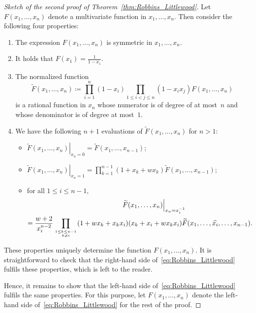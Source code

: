 \documentclass[ALCO, Unicode]{cedram}
\newcommand\myatop[2]{\genfrac{}{}{0pt}{}{#1}{#2}}
\begin{document}
	\begin{proof}[Sketch of the second proof of Theorem~\ref{thm:Robbins_Littlewood}]
		Let $F(x_1,\dots,x_n)$ denote a multivariate function in $x_1,\dots,x_n$. Then consider the following four properties:
		\begin{enumerate}[label=(\roman*)]
			\item\label{enum:IK1} The expression $F(x_1,\dots,x_n)$ is symmetric in $x_1,\dots,x_n$.
			\item\label{enum:IK2}  It holds that $F(x_1)=\frac{1}{1-x_1}$.
			\item\label{enum:IK3} The normalized function
			\begin{equation*}
				\widetilde{F}(x_1,\dots,x_n) \coloneqq \prod_{i=1}^{n} (1-x_i) \prod_{1 \le i < j \le n} (1-x_i x_j)F(x_1,\dots,x_n)
			\end{equation*} is a rational function in $x_n$ whose numerator is of degree 	of at most~$n$ and whose denominator is of degree at most~$1$.
			\item\label{enum:IK4} We have the following $n+1$ evaluations of $\widetilde{F}(x_1,\dots,x_n)$ for $n > 1$:
			\begin{itemize}
				\item $\left.\widetilde{F}(x_1,\dots,x_n)\right\vert_{x_n=0} = \widetilde{F}(x_1,\dots,x_{n-1})$;
				\item $\left.\widetilde{F}(x_1,\dots,x_n)\right\vert_{x_n=1} = \prod_{k=1}^{n-1} (1 + x_k + w x_k) \widetilde{F}(x_1,\dots,x_{n-1})$;
				\item for all $1 \le i \le n-1$, 
				\begin{multline*}
					\qquad\qquad\left.\widetilde{F}(x_1,\dots,x_n)\right\vert_{x_n=x_i^{-1}} \\
					= \frac{w+2}{x_i^{n-2}} \prod_{\myatop{1 \le k \le n-1}{k \neq i}} (1 + w x_k + x_k x_i)(x_k + x_i + w x_k x_i) \widetilde{F}(x_1,\dots,\widehat{x_i},\dots,x_{n-1}).
				\end{multline*}
			\end{itemize}	
		\end{enumerate}
		
		These properties uniquely determine the function $F(x_1,\dots,x_n)$. It is straightforward to check that the right-hand side of~\eqref{eq:Robbins_Littlewood} fulfils these properties, which is left to the reader.
		
		Hence, it remains to show that the left-hand side of~\eqref{eq:Robbins_Littlewood} fulfils the same properties. For this purpose, let $F(x_1,\dots,x_n)$ denote the left-hand side of~\eqref{eq:Robbins_Littlewood} for the rest of the proof.
		

\end{proof}
\end{document}
